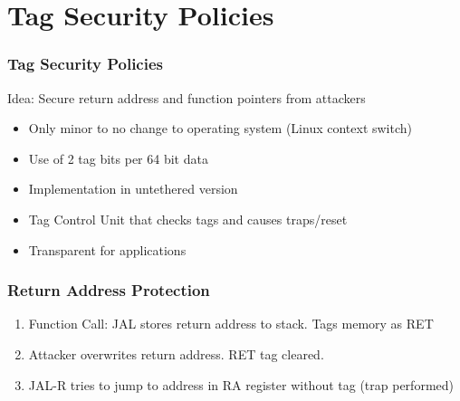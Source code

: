\documentclass{beamer}
\begin{document}
\section{Tag Security Policies}

\begin{frame}
	\frametitle{Tag Security Policies}
   Idea: Secure return address and function pointers from attackers
   \begin{itemize}
	   \item Only minor to no change to operating system (Linux context switch)
 	  \item Use of 2 tag bits per 64 bit data %
 	  \item Implementation in untethered version
 	  \item Tag Control Unit that checks tags and causes traps/reset   
 	  \item Transparent for applications
   \end{itemize}
\end{frame}

\begin{frame}
	\frametitle{Return Address Protection}
	\begin{enumerate}
	\item Function Call: JAL stores return address to stack. Tags memory as RET
	\item Attacker overwrites return address. RET tag cleared.
	\item JAL-R tries to jump to address in RA register without tag (trap performed)
	\end{enumerate}
	\begin{figure}[!h]
		\begin{center}
	\end{center}
	\end{figure}
\end{frame}
\end{document}
